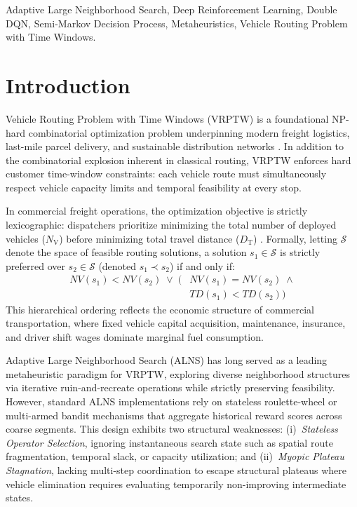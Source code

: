 \documentclass{ieeeaccess}
\newcommand{\NV}{{N_\mathrm{V}}}
\newcommand{\TD}{{D_\mathrm{T}}}
\begin{document}
\begin{keywords}
Adaptive Large Neighborhood Search, Deep Reinforcement Learning, Double DQN, Semi-Markov Decision Process, Metaheuristics, Vehicle Routing Problem with Time Windows.
\end{keywords}

\titlepgskip=-19.5pt

\maketitle

\section{Introduction}
\label{sec:introduction}

 Vehicle Routing Problem with Time Windows (VRPTW) is a foundational NP-hard combinatorial optimization problem underpinning modern freight logistics, last-mile parcel delivery, and sustainable distribution networks \cite{Dantzig1959, Solomon1987}. In addition to the combinatorial explosion inherent in classical routing, VRPTW enforces hard customer time-window constraints: each vehicle route must simultaneously respect vehicle capacity limits and temporal feasibility at every stop.

In commercial freight operations, the optimization objective is strictly lexicographic: dispatchers prioritize minimizing the total number of deployed vehicles ($\NV$) before minimizing total travel distance ($\TD$) \cite{Toth2014, braysy2005vehicle}. Formally, letting $\mathcal{S}$ denote the space of feasible routing solutions, a solution $s_1 \in \mathcal{S}$ is strictly preferred over $s_2 \in \mathcal{S}$ (denoted $s_1 \prec s_2$) if and only if:
\begin{equation}
  \begin{aligned}
    NV(s_1) < NV(s_2) \;\lor\; \big(&NV(s_1) = NV(s_2) \;\land \\
    &TD(s_1) < TD(s_2)\big)
  \end{aligned}
  \label{eq:lexicographic_intro}
\end{equation}
This hierarchical ordering reflects the economic structure of commercial transportation, where fixed vehicle capital acquisition, maintenance, insurance, and driver shift wages dominate marginal fuel consumption.

Adaptive Large Neighborhood Search (ALNS) \cite{pisinger2007general, Ropke2006} has long served as a leading metaheuristic paradigm for VRPTW, exploring diverse neighborhood structures via iterative ruin-and-recreate operations while strictly preserving feasibility. However, standard ALNS implementations rely on stateless roulette-wheel or multi-armed bandit mechanisms that aggregate historical reward scores across coarse segments. This design exhibits two structural weaknesses: (i)~\textit{Stateless Operator Selection}, ignoring instantaneous search state such as spatial route fragmentation, temporal slack, or capacity utilization; and (ii)~\textit{Myopic Plateau Stagnation}, lacking multi-step coordination to escape structural plateaus where vehicle elimination requires evaluating temporarily non-improving intermediate states.
\end{document}
